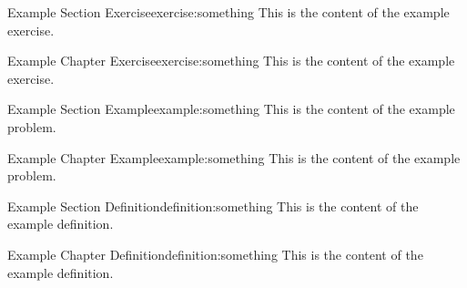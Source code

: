 \documentclass{report}
\begin{document}
\begin{section_exercise}{Example Section Exercise}{exercise:something}
    This is the content of the example exercise.
\end{section_exercise}

\begin{chapter_exercise}{Example Chapter Exercise}{exercise:something}
    This is the content of the example exercise.
\end{chapter_exercise}

\begin{section_example}{Example Section Example}{example:something}
    This is the content of the example problem.
\end{section_example}

\begin{chapter_example}{Example Chapter Example}{example:something}
    This is the content of the example problem.
\end{chapter_example}

\begin{section_definition}{Example Section Definition}{definition:something}
    This is the content of the example definition.
\end{section_definition}

\begin{chapter_definition}{Example Chapter Definition}{definition:something}
    This is the content of the example definition.
\end{chapter_definition}
\end{document}
